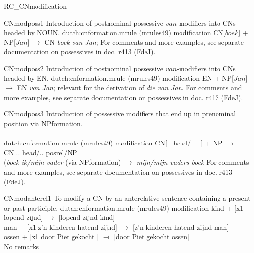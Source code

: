 \begin{mruleclass}{RC\_CNmodification}
\begin{members}
\begin{member}
 CNmodposs1
Introduction of postnominal possessive $van$-modifiers into CNs headed by NOUN.
\file dutch:cnformation.mrule (mrules49)
\semantics modification
\example CN[$boek$] + NP[$Jan$] $\rightarrow$ CN {\em boek van Jan}; 
\remarks For comments and more examples, see 
separate documentation on possessives in doc. r413 (FdeJ).
\end{member}
\begin{member}
 CNmodposs2
Introduction of postnominal possessive $van$-modifiers into CNs headed by EN.
\file dutch:cnformation.mrule (mrules49)
\semantics modification
\example EN + NP[$Jan$] $\rightarrow$ EN {\em van Jan}; 
relevant for the 
derivation of {\em die van Jan}.
\remarks For comments and more examples, see 
separate documentation on possessives in doc. r413 (FdeJ).
\end{member}
\begin{member}
 CNmodposs3
Introduction of possessive modifiers that end up in prenominal position
via NPformation.  \\ \\
\file dutch:cnformation.mrule (mrules49)
\semantics modification
\example
CN[.. head/.. ..]  + NP  $\rightarrow$ CN[.. head/.. posrel/NP] \\
({\em boek ik/mijn vader} (via NPformation) $\rightarrow$ {\em 
mijn/mijn vaders boek}
\remarks For comments and more examples, see 
separate documentation on possessives in doc. r413 (FdeJ).

\end{member}

\begin{member}
 CNmodanterel1
 To modify a CN by an anterelative sentence containing
a present or past participle.
\file dutch:cnformation.mrule (mrules49)
\semantics modification
\example
kind + [x1 lopend zijnd] $\rightarrow$ [lopend zijnd kind]\\
man  + [x1 z'n kinderen hatend zijnd] $\rightarrow$ [z'n kinderen hatend zijnd man]\\
ossen + [x1 door Piet gekocht ] $\rightarrow$ [door Piet gekocht ossen]\\
\remarks No remarks
\end{member}


\end{members}
\end{mruleclass}

